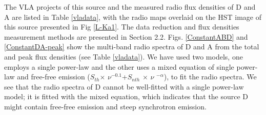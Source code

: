 \documentclass[]{aa} %
\begin{document}
  The VLA projects of this source and the measured radio flux densities of D and A are listed in Table \ref{vladata}, with the radio maps overlaid on the HST image of this source presented in Fig \ref{L-Ka1}. The data reduction and flux densities measurement methods are presented in Section 2.2.  Figs. \ref{ConstantABD} and \ref{ConstantDA-peak} show the multi-band radio spectra of D and A from the total and peak flux densities (see Table \ref{vladata}). We have used two models, one employs a single power-law and the other uses a mixed equation of single power-law and free-free emission ($S_{th} $$\times$ $\nu$$^{-0.1}$+$S_{nth}$ $\times$ $\nu$ $^{-\alpha}$), to fit the radio spectra. We see that the radio spectra of D cannot be well-fitted with a single power-law model; it is fitted with the mixed equation, which indicates that the source D might contain free-free emission and steep synchrotron emission.

\end{document}
